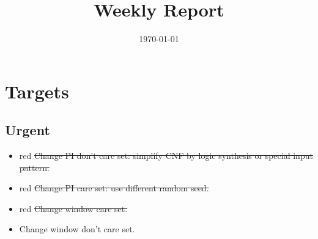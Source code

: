 \documentclass{rpt}
\title{Weekly Report}
\author{}
\date{\today}
\begin{document}
\maketitle

\section{Targets}

\subsection{Urgent}
\begin{itemize}
    \item
        \begin{color}{red}
            \sout{Change PI don't care set: simplify CNF by logic synthesis or special input pattern.}
        \end{color}
    \item
        \begin{color}{red}
            \sout{Change PI care set: use different random seed.}
        \end{color}
    \item
        \begin{color}{red}
            \sout{Change window care set.}
        \end{color}
    \item
        Change window don't care set.
\end{itemize}
\end{document}
